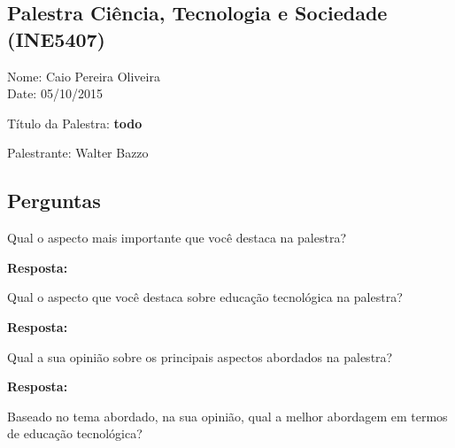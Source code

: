 \documentclass{article}
\begin{document}
\begin{center}
\section*{Palestra Ciência, Tecnologia e Sociedade (INE5407)}
\begin{center}
Nome: Caio Pereira Oliveira
\\Date: 05/10/2015
\end{center}
Título da Palestra: {\bf todo}

Palestrante: Walter Bazzo

\subsection*{Perguntas}

\end{center}

\begin{enumerate} %

{\bf \item Qual o aspecto mais importante que você destaca na palestra?}

{\bf Resposta:} 

{\bf \item Qual o aspecto que você destaca sobre educação tecnológica na palestra?}

{\bf Resposta:} 

{\bf \item Qual a sua opinião sobre os principais aspectos abordados na palestra?}

{\bf Resposta:} 

{\bf \item Baseado no tema abordado, na sua opinião, qual a melhor abordagem em termos de educação tecnológica? }


\end{enumerate}
\end{document}
